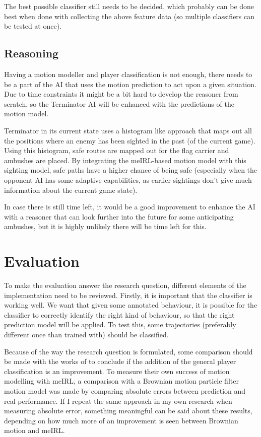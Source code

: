 \documentclass[a4paper, 12pt]{article}
\begin{document}
The best possible classifier still needs to be decided, which probably can be
done best when done with collecting the above feature data (so multiple
classifiers can be tested at once).

\subsection{Reasoning}
Having a motion modeller and player classification is not enough, there needs to
be a part of the AI that uses the motion prediction to act upon a given
situation. Due to time constraints it might be a bit hard to develop the
reasoner from scratch, so the Terminator AI will be enhanced with the
predictions of the motion model.

Terminator in its current state uses a histogram like approach that maps out all
the positions where an enemy has been sighted in the past (of the current game).
Using this histogram, safe routes are mapped out for the flag carrier and
ambushes are placed.
By integrating the meIRL-based motion model with this sighting model, safe paths
have a higher chance of being safe (especially when the opponent AI has some
adaptive capabilities, as earlier sightings don't give much information about
the current game state). 

In case there is still time left, it would be a good improvement to enhance the
AI with a reasoner that can look further into the future for some anticipating
ambushes, but it is highly unlikely there will be time left for this.


\section{Evaluation}
To make the evaluation answer the research question, different elements of
the implementation need to be reviewed. 
Firstly, it is important that the classifier is working well. We want that
given some annotated behaviour, it is possible for the classifier to correctly
identify the right kind of behaviour, so that the right prediction model will
be applied.
To test this, some trajectories (preferably different once than trained
with) should be classified. 

Because of the way the research question is formulated, some comparison
should be made with the works of \citep{6374144} to conclude if the addition of
the general player classification is an improvement.
To measure their own success of motion modelling with meIRL, a comparison with a Brownian motion
particle filter motion model was made by comparing absolute errors between
prediction and real performance. If I repeat the same approach in my own
research when measuring absolute error, something meaningful can be said about
these results, depending on how much more of an improvement is seen between
Brownian motion and meIRL.
\end{document}
